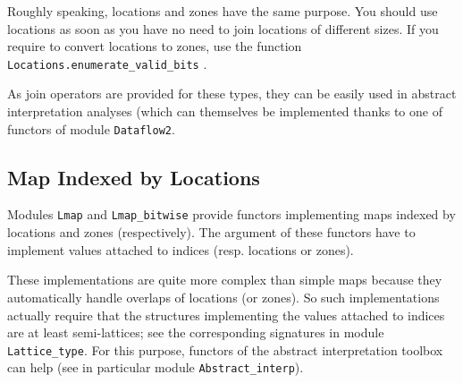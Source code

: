 \begin{convention}
  Roughly speaking, locations and zones have the same purpose. You should use
  locations as soon as you have no need to join locations of different sizes.
  If you require to convert locations to zones, use the function
  \texttt{Locations.enumerate\_valid\_bits}%
  .
\end{convention}

As join operators are provided for these types, they can be easily used in
abstract interpretation analyses (which can
themselves be implemented thanks to one of functors of module
\texttt{Dataflow2}.

\subsection{Map Indexed by Locations}\label{memory:map}

Modules \texttt{Lmap} and
\texttt{Lmap\_bitwise} provide functors implementing
maps indexed by locations and zones (respectively). The argument of these
functors have to implement values attached to indices (resp. locations or zones).

These implementations are quite more complex than simple maps because they
automatically handle overlaps of locations (or zones). So such implementations
actually require that the structures implementing the values attached to indices
are at least semi-lattices; see the corresponding signatures
in module \texttt{Lattice\_type}. For
this purpose, functors of the abstract interpretation toolbox%
 can help (see in particular module
\texttt{Abstract\_interp}).





